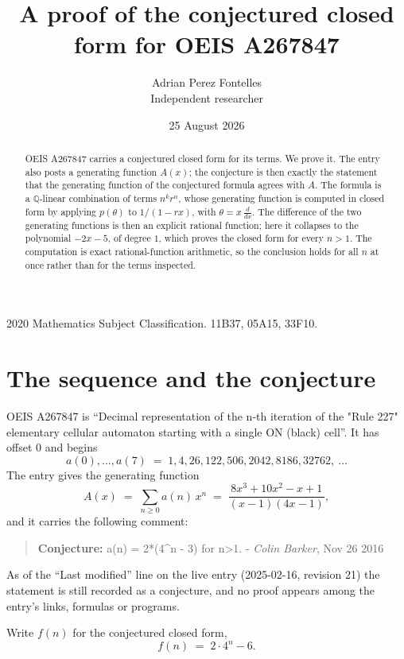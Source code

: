 \documentclass[11pt,a4paper]{article}
\title{A proof of the conjectured closed form for OEIS A267847}
\author{Adrian Perez Fontelles\\ \small Independent researcher}
\date{25 August 2026}
\theoremstyle{plain}
\theoremstyle{definition}
\begin{document}
\maketitle

\begin{abstract}
OEIS A267847 carries a conjectured closed form for its terms. We prove it. The entry
also posts a generating function $A(x)$; the conjecture is then exactly the statement
that the generating function of the conjectured formula agrees with $A$. The formula is
a $\mathbb{Q}$-linear combination of terms $n^{k}r^{n}$, whose generating function is
computed in closed form by applying $p(\theta)$ to $1/(1-rx)$, with
$\theta=x\,\frac{d}{dx}$. The difference of the two generating functions is then an
explicit rational function; here it collapses to the polynomial $- 2 x - 5$, of degree
$1$, which proves the closed form for every $n>1$. The computation is exact
rational-function arithmetic, so the conclusion holds for all $n$ at once rather than
for the terms inspected.
\end{abstract}

\noindent\small 2020 Mathematics Subject Classification. 11B37, 05A15, 33F10.\normalsize

\section{The sequence and the conjecture}

OEIS A267847 is ``Decimal representation of the n-th iteration of the "Rule 227" elementary cellular automaton starting with a single ON (black) cell''. It has offset $0$ and begins
\[
a(0),\dots,a(7)\;=\;1, 4, 26, 122, 506, 2042, 8186, 32762,\ \dots
\]
The entry gives the generating function
\begin{equation}\label{eq:gf}
A(x)\;=\;\sum_{n\ge 0} a(n)\,x^{n}\;=\;\frac{8 x^{3} + 10 x^{2} - x + 1}{\left(x - 1\right) \left(4 x - 1\right)} ,
\end{equation}
and it carries the following comment:
\begin{quote}\small
\textbf{Conjecture:} a(n) = 2*(4\^{}n - 3) for n>1. - \emph{Colin Barker}, Nov 26 2016
\end{quote}
As of the ``Last modified'' line on the live entry (2025-02-16, revision 21) the
statement is still recorded as a conjecture, and no proof appears among the entry's links,
formulas or programs.

Write $f(n)$ for the conjectured closed form,
\[
f(n)\;=\;2 \cdot 4^{n} - 6 .
\]
\end{document}
